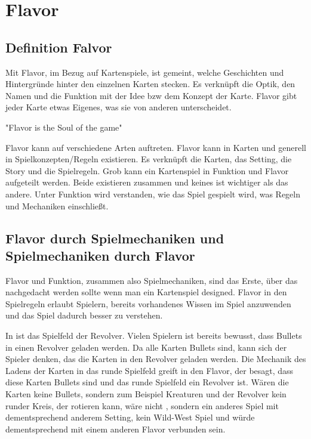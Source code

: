 
\section{Flavor}\label{sec:flavor}

\renewcommand{\kapitelautor}{Autor: Philip Jankovic}

\subsection{Definition Falvor}\label{subsec:wichtigkeit-des-flavours}
%
Mit Flavor, im Bezug auf Kartenspiele, ist gemeint, welche Geschichten und Hintergründe hinter den einzelnen Karten stecken.
Es verknüpft die Optik, den Namen und die Funktion mit der Idee bzw dem Konzept der Karte.
Flavor gibt jeder Karte etwas Eigenes, was sie von anderen unterscheidet.

"Flavor is the Soul of the game"


Flavor kann auf verschiedene Arten auftreten. Flavor kann in Karten und generell in Spielkonzepten/Regeln existieren.
Es verknüpft die Karten, das Setting, die Story und die Spielregeln. Grob kann ein Kartenspiel in Funktion und Flavor aufgeteilt werden.
Beide existieren zusammen und keines ist wichtiger als das andere.
Unter Funktion wird verstanden, wie das Spiel gespielt wird, was Regeln und Mechaniken einschließt.


\subsection{Flavor durch Spielmechaniken und Spielmechaniken durch Flavor}

Flavor und Funktion, zusammen also Spielmechaniken, sind das Erste, über das nachgedacht werden sollte wenn man ein Kartenspiel designed.
Flavor in den Spielregeln erlaubt Spielern, bereits vorhandenes Wissen im Spiel anzuwenden und das Spiel dadurch besser zu verstehen. 


In \FF ist das Spielfeld der Revolver. Vielen Spielern ist bereits bewusst, dass Bullets in einen
Revolver geladen werden. Da alle Karten Bullets sind, kann sich der Spieler denken, das die Karten in den Revolver geladen werden. Die Mechanik des Ladens
der Karten in das runde Spielfeld greift in den Flavor, der besagt, dass diese Karten Bullets sind und das runde Spielfeld
ein Revolver ist. Wären die Karten keine Bullets, sondern zum Beispiel Kreaturen und der Revolver kein runder Kreis,
der rotieren kann, wäre \FF nicht \FF, sondern ein anderes Spiel mit dementsprechend anderem Setting, kein Wild-West
Spiel und würde dementsprechend mit einem anderen Flavor verbunden sein.


